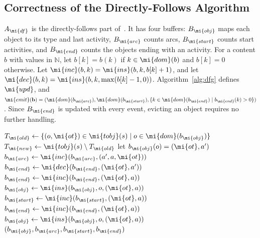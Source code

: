 \subsection{Correctness of the Directly-Follows Algorithm}

\begin{definition}
\label{def:dfg}
$A_{\mi{df}}$ is the directly-follows part of~\cite{Muehlmeyer2026}.
It has four buffers: $B_{\mi{obj}}$ maps each object to its type and last
activity, $B_{\mi{arc}}$ counts arcs, $B_{\mi{start}}$ counts start activities,
and $B_{\mi{end}}$ counts the objects ending with an activity.
For a content $b$ with values in $\mathbb{N}$, let $b[k] = b(k)$ if
$k \in \mi{dom}(b)$ and $b[k] = 0$ otherwise.
Let $\mi{inc}(b, k) = \mi{ins}(b, k, b[k] + 1)$, and let
$\mi{dec}(b, k) = \mi{ins}(b, k, \max(b[k] - 1, 0))$.
Algorithm~\ref{alg:dfg} defines $\mi{upd}$, and
$\mi{emit}(\mathbf{b}) = (\mi{dom}(b_{\mi{arc}}), \mi{dom}(b_{\mi{start}}),
\{k \in \mi{dom}(b_{\mi{end}}) \mid b_{\mi{end}}(k) > 0\})$.
Since $B_{\mi{end}}$ is updated with every event, evicting an object requires
no further handling.
\end{definition}

\begin{algorithm}[t]
\caption{The function $\mi{upd}$ of $A_{\mi{df}}$.
Buffered objects are processed first, so that their entries are the most
recent ones when new objects are inserted.}
\label{alg:dfg}
\begin{algorithmic}[1]
    \State $T_{\mi{old}} \gets \{(o, \mi{ot}) \in \mi{tobj}(s) \mid
           o \in \mi{dom}(b_{\mi{obj}})\}$
    \State $T_{\mi{new}} \gets \mi{tobj}(s) \setminus T_{\mi{old}}$
      \State let $b_{\mi{obj}}(o) = (\mi{ot}, a')$
      \State $b_{\mi{arc}} \gets \mi{inc}(b_{\mi{arc}}, (a', a, \mi{ot}))$
      \State $b_{\mi{end}} \gets \mi{dec}(b_{\mi{end}}, (\mi{ot}, a'))$
      \State $b_{\mi{end}} \gets \mi{inc}(b_{\mi{end}}, (\mi{ot}, a))$
      \State $b_{\mi{obj}} \gets \mi{ins}(b_{\mi{obj}}, o, (\mi{ot}, a))$
    \EndFor
      \State $b_{\mi{start}} \gets \mi{inc}(b_{\mi{start}}, (\mi{ot}, a))$
      \State $b_{\mi{end}} \gets \mi{inc}(b_{\mi{end}}, (\mi{ot}, a))$
      \State $b_{\mi{obj}} \gets \mi{ins}(b_{\mi{obj}}, o, (\mi{ot}, a))$
    \EndFor
  \EndIf
  \State \Return $(b_{\mi{obj}}, b_{\mi{arc}}, b_{\mi{start}}, b_{\mi{end}})$
\EndFunction
\end{algorithmic}
\end{algorithm}

